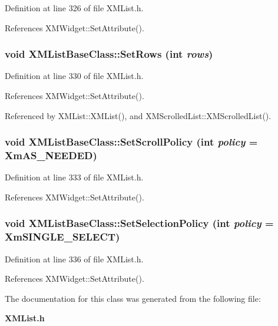 Definition at line 326 of file XMList.h.

References XMWidget::Set\-Attribute().
\subsubsection{\setlength{\rightskip}{0pt plus 5cm}void XMList\-Base\-Class::Set\-Rows (int {\em rows})\hspace{0.3cm}{\tt  [inline]}}\label{classXMListBaseClass_a6}




Definition at line 330 of file XMList.h.

References XMWidget::Set\-Attribute().

Referenced by XMList::XMList(), and XMScrolled\-List::XMScrolled\-List().
\subsubsection{\setlength{\rightskip}{0pt plus 5cm}void XMList\-Base\-Class::Set\-Scroll\-Policy (int {\em policy} = Xm\-AS\_\-NEEDED)\hspace{0.3cm}{\tt  [inline]}}\label{classXMListBaseClass_a7}




Definition at line 333 of file XMList.h.

References XMWidget::Set\-Attribute().
\subsubsection{\setlength{\rightskip}{0pt plus 5cm}void XMList\-Base\-Class::Set\-Selection\-Policy (int {\em policy} = Xm\-SINGLE\_\-SELECT)\hspace{0.3cm}{\tt  [inline]}}\label{classXMListBaseClass_a8}




Definition at line 336 of file XMList.h.

References XMWidget::Set\-Attribute().

The documentation for this class was generated from the following file:\begin{CompactItemize}
\item 
{\bf XMList.h}\end{CompactItemize}
